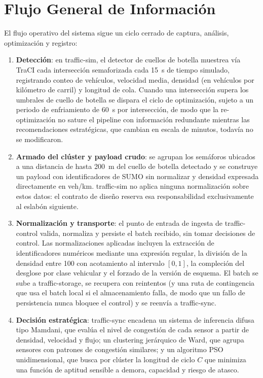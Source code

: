 \section{Flujo General de Información}

El flujo operativo del sistema sigue un ciclo cerrado de captura, análisis, optimización y registro:

\begin{enumerate}
    \item \textbf{Detección}: en traffic-sim, el detector de cuellos de botella muestrea vía TraCI cada intersección semaforizada cada 15~s de tiempo simulado, registrando conteo de vehículos, velocidad media, densidad (en vehículos por kilómetro de carril) y longitud de cola. Cuando una intersección supera los umbrales de cuello de botella se dispara el ciclo de optimización, sujeto a un periodo de enfriamiento de 60~s por intersección, de modo que la re-optimización no sature el pipeline con información redundante mientras las recomendaciones estratégicas, que cambian en escala de minutos, todavía no se modificaron.

    \item \textbf{Armado del clúster y payload crudo}: se agrupan los semáforos ubicados a una distancia de hasta 200~m del cuello de botella detectado y se construye un payload con identificadores de SUMO sin normalizar y densidad expresada directamente en veh/km. traffic-sim no aplica ninguna normalización sobre estos datos: el contrato de diseño reserva esa responsabilidad exclusivamente al eslabón siguiente.

    \item \textbf{Normalización y transporte}: el punto de entrada de ingesta de traffic-control valida, normaliza y persiste el batch recibido, sin tomar decisiones de control. Las normalizaciones aplicadas incluyen la extracción de identificadores numéricos mediante una expresión regular, la división de la densidad entre 100 con acotamiento al intervalo $[0,1]$, la compleción del desglose por clase vehicular y el forzado de la versión de esquema. El batch se sube a traffic-storage, se recupera con reintentos (y una ruta de contingencia que usa el batch local si el almacenamiento falla, de modo que un fallo de persistencia nunca bloquee el control) y se reenvía a traffic-sync.

    \item \textbf{Decisión estratégica}: traffic-sync encadena un sistema de inferencia difusa tipo Mamdani, que evalúa el nivel de congestión de cada sensor a partir de densidad, velocidad y flujo; un clustering jerárquico de Ward, que agrupa sensores con patrones de congestión similares; y un algoritmo PSO unidimensional, que busca por clúster la longitud de ciclo $C$ que minimiza una función de aptitud sensible a demora, capacidad y riesgo de atasco.


\end{enumerate}
